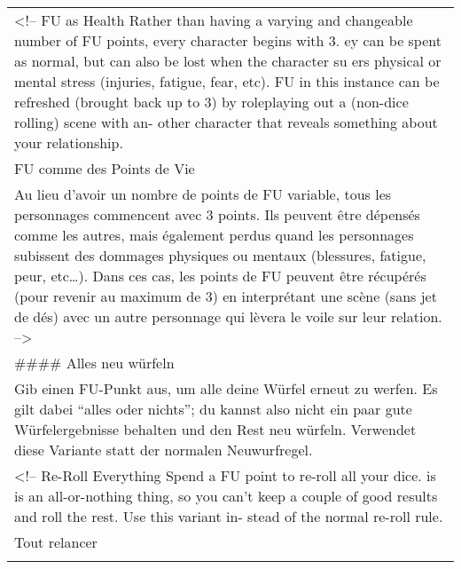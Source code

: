 \documentclass[]{article}
\begin{document}
\begin{longtable}[]{@{}l@{}}
\begin{minipage}[t]{0.05\columnwidth}
\textless{}!-- FU as Health Rather than having a varying and changeable
number of FU points, every character begins with 3. ey can be spent as
normal, but can also be lost when the character su ers physical or
mental stress (injuries, fatigue, fear, etc). FU in this instance can be
refreshed (brought back up to 3) by roleplaying out a (non-dice rolling)
scene with an- other character that reveals something about your
relationship.
\strut\end{minipage}\tabularnewline
\begin{minipage}[t]{0.05\columnwidth}\raggedright\strut
FU comme des Points de Vie
\strut\end{minipage}\tabularnewline
\begin{minipage}[t]{0.05\columnwidth}\raggedright\strut
Au lieu d'avoir un nombre de points de FU variable, tous les personnages
commencent avec 3 points. Ils peuvent être dépensés comme les autres,
mais également perdus quand les personnages subissent des dommages
physiques ou mentaux (blessures, fatigue, peur, etc\ldots{}). Dans ces
cas, les points de FU peuvent être récupérés (pour revenir au maximum de
3) en interprétant une scène (sans jet de dés) avec un autre personnage
qui lèvera le voile sur leur relation. --\textgreater{}
\strut\end{minipage}\tabularnewline
\begin{minipage}[t]{0.05\columnwidth}\raggedright\strut
\#\#\#\# Alles neu würfeln
\strut\end{minipage}\tabularnewline
\begin{minipage}[t]{0.05\columnwidth}\raggedright\strut
Gib einen FU-Punkt aus, um alle deine Würfel erneut zu werfen. Es gilt
dabei ``alles oder nichts''; du kannst also nicht ein paar gute
Würfelergebnisse behalten und den Rest neu würfeln. Verwendet diese
Variante statt der normalen Neuwurfregel.
\strut\end{minipage}\tabularnewline
\begin{minipage}[t]{0.05\columnwidth}\raggedright\strut
\textless{}!-- Re-Roll Everything Spend a FU point to re-roll all your
dice. is is an all-or-nothing thing, so you can't keep a couple of good
results and roll the rest. Use this variant in- stead of the normal
re-roll rule.
\strut\end{minipage}\tabularnewline
\begin{minipage}[t]{0.05\columnwidth}\raggedright\strut
Tout relancer
\strut\end{minipage}\tabularnewline
\begin{minipage}[t]{0.05\columnwidth}\raggedright\strut

\end{minipage}
\end{longtable}
\end{document}
